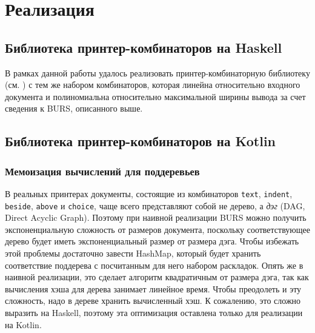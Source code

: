 \section{Реализация}



\newpage
\subsection{Библиотека принтер-комбинаторов на Haskell}
В рамках данной работы удалось реализовать
принтер-комбинаторную библиотеку (см. \cite{haskellImpl}) с тем же набором комбинаторов,
которая линейна относительно входного документа и полиномиальна
относительно максимальной ширины вывода за счет сведения к BURS, описанного выше.




\newpage
\subsection{Библиотека принтер-комбинаторов на Kotlin}

\subsubsection{Мемоизация вычислений для поддеревьев}

В реальных принтерах документы, состоящие из комбинаторов
\lstinline[language=Haskell]{text},
\lstinline[language=Haskell]{indent},
\lstinline[language=Haskell]{beside},
\lstinline[language=Haskell]{above} и \lstinline[language=Haskell]{choice}, чаще всего
представляют собой не дерево, а \textit{дэг} (DAG, Direct Acyclic Graph). Поэтому при наивной
реализации BURS можно получить экспоненциальную сложность от размеров документа,
поскольку соответствующее дерево будет иметь экспоненциальный размер от размера дэга.
Чтобы избежать этой проблемы достаточно завести HashMap, который будет хранить соответствие
поддерева с посчитанным для него набором раскладок. Опять же в наивной реализации,
это сделает алгоритм квадратичным от размера дэга, так как вычисления хэша для дерева занимает
линейное время. Чтобы преодолеть и эту сложность, надо в дереве хранить вычисленный хэш.
К сожалению, это сложно выразить на Haskell, поэтому эта оптимизация оставлена только для реализации
на Kotlin.

